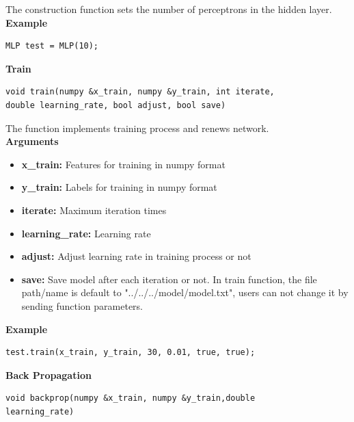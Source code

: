 \documentclass[letterpaper]{article}
\begin{document}
The construction function sets the number of perceptrons in the hidden layer.\\
\textbf{Example}
\begin{lstlisting}[language={[ANSI]C++},keywordstyle=\color{blue!70},commentstyle=\color{red!50!green!50!blue!50},frame=shadowbox, rulesepcolor=\color{red!20!green!20!blue!20}]
MLP test = MLP(10);
\end{lstlisting}
\textbf{\Large Train}
\begin{lstlisting}[language={[ANSI]C++},keywordstyle=\color{blue!70},commentstyle=\color{red!50!green!50!blue!50},frame=shadowbox, rulesepcolor=\color{red!20!green!20!blue!20}]
void train(numpy &x_train, numpy &y_train, int iterate, 
double learning_rate, bool adjust, bool save)
\end{lstlisting}

The function implements training process and renews network.\\
\textbf{Arguments}
\begin{itemize}
	\item{\textbf{x\_train:} Features for training in numpy format}
    \item{\textbf{y\_train:} Labels for training in numpy format}
    \item{\textbf{iterate:} Maximum iteration times}
    \item{\textbf{learning\_rate:} Learning rate}
    \item{\textbf{adjust:} Adjust learning rate in training process or not}
    \item{\textbf{save:} Save model after each iteration or not. In train function, the file path/name is default to "../../../model/model.txt", users can not change it by sending function parameters.}
\end{itemize}
\textbf{Example}
\begin{lstlisting}[language={[ANSI]C++},keywordstyle=\color{blue!70},commentstyle=\color{red!50!green!50!blue!50},frame=shadowbox, rulesepcolor=\color{red!20!green!20!blue!20}]
test.train(x_train, y_train, 30, 0.01, true, true);
\end{lstlisting}
\textbf{\Large Back Propagation}
\begin{lstlisting}[language={[ANSI]C++},keywordstyle=\color{blue!70},commentstyle=\color{red!50!green!50!blue!50},frame=shadowbox, rulesepcolor=\color{red!20!green!20!blue!20}]
void backprop(numpy &x_train, numpy &y_train,double 
learning_rate)
\end{lstlisting}
\end{document}
